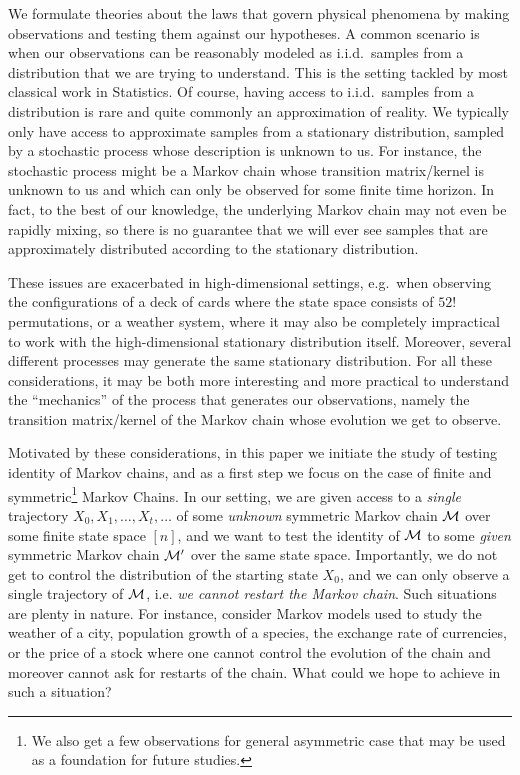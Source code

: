 We formulate theories about the laws that govern physical phenomena by making observations and testing them against our hypotheses. A common scenario is when our observations can be reasonably modeled as i.i.d.~samples from a distribution that we are trying to understand. This is the setting tackled by most classical work in Statistics. Of course, having access to i.i.d.~samples from a distribution is rare and quite commonly an approximation of reality. We typically only have access to approximate samples from a stationary distribution, sampled by a stochastic process whose description is unknown to us. For instance, the stochastic process might be a Markov chain whose transition matrix/kernel is unknown to us and which can only be observed for some finite time horizon. In fact, to the best of our knowledge, the underlying Markov chain may not even be rapidly mixing, so there is no guarantee that we will ever see samples that are approximately distributed according to the stationary distribution.

These issues are exacerbated in high-dimensional settings, e.g.~when observing the configurations of a deck of cards where the state space consists of $52!$ permutations, or a weather system, where it may also be completely impractical to work with the high-dimensional stationary distribution itself. 
{Moreover, several different processes may generate the same stationary distribution.} 
For all  these considerations, it may be both more interesting and more practical to understand the ``mechanics'' of the process that generates our observations, namely the transition matrix/kernel of the Markov chain whose evolution we get to observe.

Motivated by these considerations, in this paper we initiate the study of testing identity of Markov chains, and as a first step we focus on the case of finite and symmetric\footnote{
We also get a few observations for general asymmetric case that may be used as a foundation for future studies.} Markov Chains. In 
our setting, we are given access to a {\em single} trajectory $X_0, X_1,\ldots,X_t,\ldots$ of some {\em unknown} symmetric Markov chain ${\cal M}$ over some finite state space $[n]$, and we want 
to test the identity of ${\cal M}$ to some {\em given} symmetric Markov chain ${\cal M}'$ over the same state space. Importantly, we do not get to control the distribution of the starting state 
$X_0$, and we can only observe a single trajectory of ${\cal M}$, i.e. {\em we cannot restart the Markov chain}. Such situations are plenty in nature. For instance, consider Markov models used to study the weather of a city, population growth of a species, the exchange rate of currencies, or the price of a stock where one cannot control the evolution of the chain and moreover cannot ask for restarts of the chain. What could we hope to achieve in such a situation?\\

